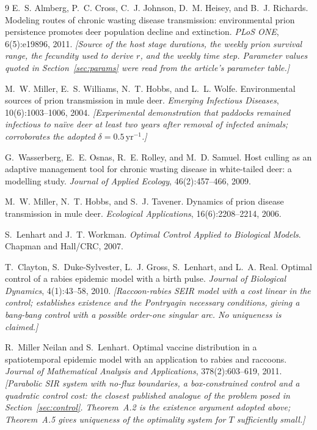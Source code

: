\documentclass[11pt]{article}
\begin{document}

\begin{thebibliography}{9}
E.~S. Almberg, P.~C. Cross, C.~J. Johnson, D.~M. Heisey, and B.~J. Richards.
\newblock Modeling routes of chronic wasting disease transmission: environmental prion persistence promotes deer population decline and extinction.
\newblock \textit{PLoS ONE}, 6(5):e19896, 2011.
\newblock \textit{[Source of the host stage durations, the weekly prion survival range, the fecundity used to derive $r$, and the weekly time step. Parameter values quoted in Section~\ref{sec:params} were read from the article's parameter table.]}

M.~W. Miller, E.~S. Williams, N.~T. Hobbs, and L.~L. Wolfe.
\newblock Environmental sources of prion transmission in mule deer.
\newblock \textit{Emerging Infectious Diseases}, 10(6):1003--1006, 2004.
\newblock \textit{[Experimental demonstration that paddocks remained infectious to na\"ive deer at least two years after removal of infected animals; corroborates the adopted $\delta = 0.5\,\mathrm{yr}^{-1}$.]}

G.~Wasserberg, E.~E. Osnas, R.~E. Rolley, and M.~D. Samuel.
\newblock Host culling as an adaptive management tool for chronic wasting disease in white-tailed deer: a modelling study.
\newblock \textit{Journal of Applied Ecology}, 46(2):457--466, 2009.

M.~W. Miller, N.~T. Hobbs, and S.~J. Tavener.
\newblock Dynamics of prion disease transmission in mule deer.
\newblock \textit{Ecological Applications}, 16(6):2208--2214, 2006.

S.~Lenhart and J.~T. Workman.
\newblock \textit{Optimal Control Applied to Biological Models}.
\newblock Chapman and Hall/CRC, 2007.

T.~Clayton, S.~Duke-Sylvester, L.~J. Gross, S.~Lenhart, and L.~A. Real.
\newblock Optimal control of a rabies epidemic model with a birth pulse.
\newblock \textit{Journal of Biological Dynamics}, 4(1):43--58, 2010.
\newblock \textit{[Raccoon-rabies SEIR model with a cost linear in the control; establishes existence and the Pontryagin necessary conditions, giving a bang-bang control with a possible order-one singular arc. No uniqueness is claimed.]}

R.~Miller Neilan and S.~Lenhart.
\newblock Optimal vaccine distribution in a spatiotemporal epidemic model with an application to rabies and raccoons.
\newblock \textit{Journal of Mathematical Analysis and Applications}, 378(2):603--619, 2011.
\newblock \textit{[Parabolic SIR system with no-flux boundaries, a box-constrained control and a quadratic control cost: the closest published analogue of the problem posed in Section~\ref{sec:control}. Theorem~A.2 is the existence argument adopted above; Theorem~A.5 gives uniqueness of the optimality system for $T$ sufficiently small.]}


\end{thebibliography}
\end{document}
